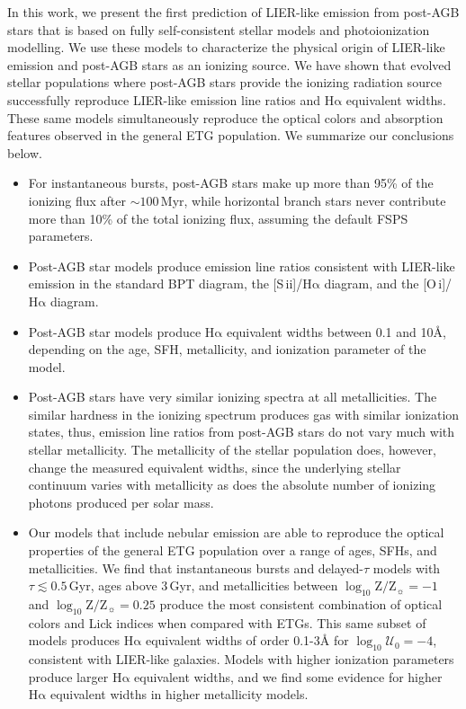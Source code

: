 \documentclass[preprint2]{aastex62}
\newcommand{\FSPS}{{\sc FSPS}\xspace}
\newcommand{\sii}{[S\,{\sc ii}]\xspace}
\newcommand{\oi}{[O\,{\sc i}]\xspace}
\newcommand{\ha}{\ensuremath{\mathrm{H\alpha}}\xspace}
\newcommand{\logten}{\ensuremath{\log_{10}}}
\newcommand{\logZeq}[1]{\ensuremath{\logten \mathrm{Z}/\mathrm{Z}_{\sun} = #1}}
\newcommand{\ang}{\ensuremath{\mbox{\AA}}\xspace}
\newcommand{\logUeq}[1]{\ensuremath{\logten \mathcal{U}_0 = #1}}
\newcommand{\Myr}{$\,$Myr\xspace}
\newcommand{\Gyr}{$\,$Gyr\xspace}
\begin{document}
In this work, we present the first prediction of LIER-like emission from post-AGB stars that is based on fully self-consistent stellar models and photoionization modelling. We use these models to characterize the physical origin of LIER-like emission and post-AGB stars as an ionizing source. We have shown that evolved stellar populations where post-AGB stars provide the ionizing radiation source successfully reproduce LIER-like emission line ratios and \ha equivalent widths. These same models simultaneously reproduce the optical colors and absorption features observed in the general ETG population. We summarize our conclusions below.

\begin{itemize}
    \item For instantaneous bursts, post-AGB stars make up more than 95\% of the ionizing flux after ${\sim}100$\Myr, while horizontal branch stars never contribute more than 10\% of the total ionizing flux, assuming the default \FSPS parameters.
    \item Post-AGB star models produce emission line ratios consistent with LIER-like emission in the standard BPT diagram, the \sii/\ha diagram, and the \oi/\ha diagram.
    \item Post-AGB star models produce \ha equivalent widths between 0.1 and 10\ang, depending on the age, SFH, metallicity, and ionization parameter of the model.
    \item Post-AGB stars have very similar ionizing spectra at all metallicities. The similar hardness in the ionizing spectrum produces gas with similar ionization states, thus, emission line ratios from post-AGB stars do not vary much with stellar metallicity. The metallicity of the stellar population does, however, change the measured equivalent widths, since the underlying stellar continuum varies with metallicity as does the absolute number of ionizing photons produced per solar mass.
    \item Our models that include nebular emission are able to reproduce the optical properties of the general ETG population over a range of ages, SFHs, and metallicities. We find that instantaneous bursts and delayed-$\tau$ models with $\tau \lesssim 0.5$\Gyr, ages above 3\Gyr, and metallicities between \logZeq{-1} and \logZeq{0.25} produce the most consistent combination of optical colors and Lick indices when compared with ETGs. This same subset of models produces \ha equivalent widths of order 0.1-3\ang for \logUeq{-4}, consistent with LIER-like galaxies. Models with higher ionization parameters produce larger \ha equivalent widths, and we find some evidence for higher \ha equivalent widths in higher metallicity models.
\end{itemize}
\end{document}
